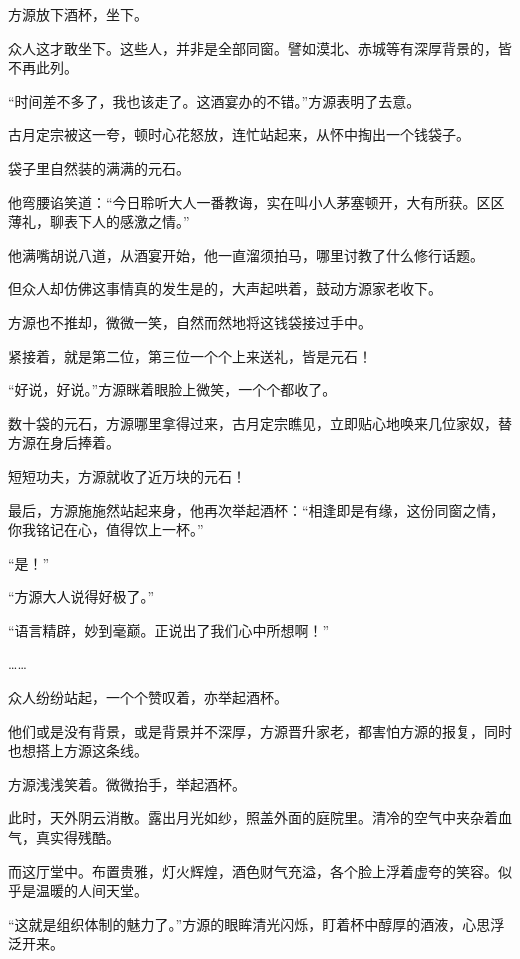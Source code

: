 
\begin{this_body}

方源放下酒杯，坐下。

众人这才敢坐下。这些人，并非是全部同窗。譬如漠北、赤城等有深厚背景的，皆不再此列。

“时间差不多了，我也该走了。这酒宴办的不错。”方源表明了去意。

古月定宗被这一夸，顿时心花怒放，连忙站起来，从怀中掏出一个钱袋子。

袋子里自然装的满满的元石。

他弯腰谄笑道：“今日聆听大人一番教诲，实在叫小人茅塞顿开，大有所获。区区薄礼，聊表下人的感激之情。”

他满嘴胡说八道，从酒宴开始，他一直溜须拍马，哪里讨教了什么修行话题。

但众人却仿佛这事情真的发生是的，大声起哄着，鼓动方源家老收下。

方源也不推却，微微一笑，自然而然地将这钱袋接过手中。

紧接着，就是第二位，第三位一个个上来送礼，皆是元石！

“好说，好说。”方源眯着眼脸上微笑，一个个都收了。

数十袋的元石，方源哪里拿得过来，古月定宗瞧见，立即贴心地唤来几位家奴，替方源在身后捧着。

短短功夫，方源就收了近万块的元石！

最后，方源施施然站起来身，他再次举起酒杯：“相逢即是有缘，这份同窗之情，你我铭记在心，值得饮上一杯。”

“是！”

“方源大人说得好极了。”

“语言精辟，妙到毫巅。正说出了我们心中所想啊！”

……

众人纷纷站起，一个个赞叹着，亦举起酒杯。

他们或是没有背景，或是背景并不深厚，方源晋升家老，都害怕方源的报复，同时也想搭上方源这条线。

方源浅浅笑着。微微抬手，举起酒杯。

此时，天外阴云消散。露出月光如纱，照盖外面的庭院里。清冷的空气中夹杂着血气，真实得残酷。

而这厅堂中。布置贵雅，灯火辉煌，酒色财气充溢，各个脸上浮着虚夸的笑容。似乎是温暖的人间天堂。

“这就是组织体制的魅力了。”方源的眼眸清光闪烁，盯着杯中醇厚的酒液，心思浮泛开来。


\end{this_body}

